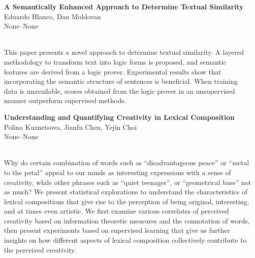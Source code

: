 \documentclass[twoside,makeidx]{book}
\begin{document}
\par\vspace{2em}\noindent%
\begin{minipage}{\linewidth}%
\begin{center}
\textbf{\normalsize A Semantically Enhanced Approach to Determine Textual Similarity}\\
\normalsize  Eduardo Blanco,  Dan Moldovan\\
{\small None--None}\\
\end{center}
\end{minipage}\\[0.5em]
\nopagebreak%
\noindent%
{\small This paper presents a novel approach to determine textual similarity. A layered methodology to transform text into logic forms is proposed, and semantic features are derived from a logic prover. Experimental results show that incorporating the semantic structure of sentences is beneficial. When training data is unavailable, scores obtained from the logic prover in an unsupervised manner outperform supervised methods.}
\par\vspace{2em}\noindent%
\begin{minipage}{\linewidth}%
\begin{center}
\textbf{\normalsize Understanding and Quantifying Creativity in Lexical Composition}\\
\normalsize  Polina Kuznetsova,  Jianfu Chen,  Yejin Choi\\
{\small None--None}\\
\end{center}
\end{minipage}\\[0.5em]
\nopagebreak%
\noindent%
{\small Why do certain combination of words such as ``disadvantageous peace'' or ``metal to the petal'' appeal to our minds as interesting expressions with a sense of creativity, while other phrases such as ``quiet teenager'', or ``geometrical base'' not as much? We present statistical explorations to understand the characteristics of lexical compositions that give rise to the perception of being original, interesting, and at times even artistic. We first examine various correlates of perceived creativity based on information theoretic measures and the connotation of words, then present experiments based on supervised learning that give us further insights on how different aspects of lexical composition collectively contribute to the perceived creativity.}
\par\vspace{2em}\noindent%
\end{document}
